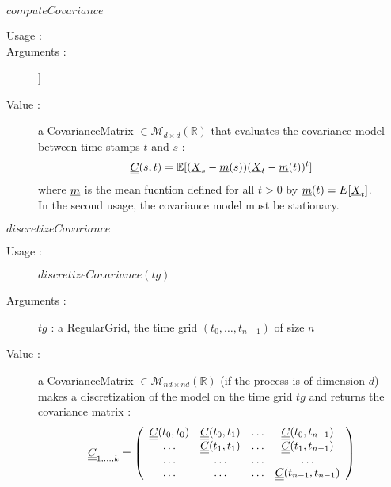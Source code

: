 \begin{description}
\begin{description}
  \item $computeCovariance$
    \begin{description}
       \item[Usage :] \rule{0pt}{1em}
        \item[Arguments :]
         ] 
       \item[Value :] a CovarianceMatrix $\in\mathcal{M}_{d\times d}(\mathbb{R})$ that evaluates the covariance model between time stamps $t$ and $s$ : 
$$
{\underline{\underline{C}}}(s, t)=\mathbb{E}[({\underline{X}}_s-{\underline{m}}(s))({\underline{X}}_t-{\underline{m}}(t))^t]
$$
where ${\underline{m}}$ is the mean fucntion defined for all $t>0$ by ${\underline{m}}(t)= E[{\underline{X}}_t]$.\\
In the second usage, the covariance model must be stationary.
    \end{description}
    \bigskip

  \item $discretizeCovariance$
    \begin{description}
    \item[Usage :] $discretizeCovariance(tg)$
    \item[Arguments :] $tg$ :  a RegularGrid, the time grid $(t_0, \dots, t_{n-1})$ of size $n$
    \item[Value :] a CovarianceMatrix $\in\mathcal{M}_{nd\times nd}(\mathbb{R})$ (if the process is of dimension $d$) makes a discretization of the model on the time grid $tg$ and returns the covariance matrix  :  
\begin{equation}\label{covMatrix}
{\underline{\underline{C}}}_{1,\dots,k} = \left(
\begin{array}{cccc}
  {\underline{\underline{C}}}(t_0, t_0) & {\underline{\underline{C}}}(t_0, t_1) & \hdots & {\underline{\underline{C}}}(t_0, t_{n-1}) \\
   \hdots &{\underline{\underline{C}}}(t_1, t_1)  & \hdots & {\underline{\underline{C}}}(t_1, t_{n-1}) \\
  \hdots & \hdots & \hdots & \hdots \\
   \hdots & \hdots & \hdots & {\underline{\underline{C}}}(t_{n-1}, t_{n-1}) 
\end{array} 
\right)
\end{equation}


\end{description}
\end{description}
\end{description}
